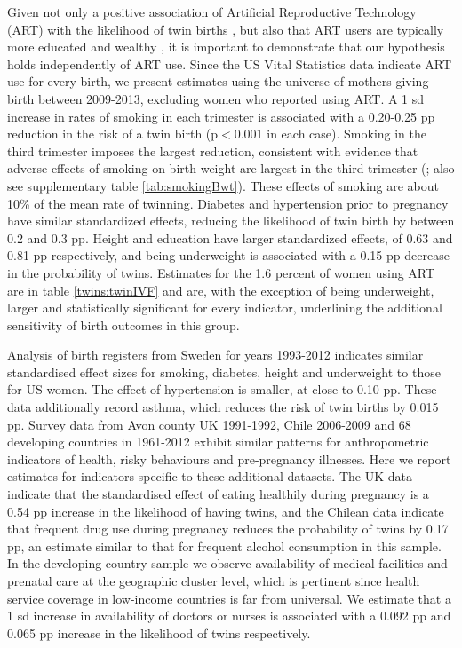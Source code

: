 \documentclass[subeqn]{article}
\begin{document}
\begin{spacing}{1.4}
Given not only a positive association of Artificial Reproductive Technology (ART)
with the likelihood of twin births \citep{Vitthalaetal2009}, but also that ART
users are typically more educated and wealthy \citep{Lundborgetal2014}, it is
important to demonstrate that our hypothesis holds independently of ART use.
Since the US Vital Statistics data indicate ART use for every birth, we present
estimates using the universe of mothers giving birth between 2009-2013, excluding
women who reported using ART. A 1 sd increase in rates of smoking in each
trimester is associated with a 0.20-0.25 pp reduction in the risk of a twin birth
(p$<$0.001 in each case). Smoking in the third trimester imposes the largest
reduction, consistent with evidence that adverse effects of smoking on birth
weight are largest in the third trimester (\citet{Bernsteinetal2005}; also see
supplementary table \ref{tab:smokingBwt}).  These effects of smoking are about
10\% of the mean rate of twinning. Diabetes and hypertension prior to pregnancy
have similar standardized effects, reducing the likelihood of twin birth by
between 0.2 and 0.3 pp. Height and education have larger standardized effects, of
0.63 and 0.81 pp respectively, and being underweight is associated with a 0.15 pp
decrease in the probability of twins. Estimates for the 1.6 percent of women using
ART are in table \ref{twins:twinIVF} and are, with the exception of being
underweight, larger and statistically significant for every indicator, underlining
the additional sensitivity of birth outcomes in this group.

Analysis of birth registers from Sweden for years 1993-2012 indicates similar
standardised effect sizes for smoking, diabetes, height and underweight to those
for US women. The effect of hypertension is smaller, at close to 0.10 pp. These
data additionally record asthma, which reduces the risk of twin births by 0.015
pp. Survey data from Avon county UK 1991-1992, Chile 2006-2009 and 68 developing
countries in 1961-2012 exhibit similar patterns for anthropometric indicators of
health, risky behaviours and pre-pregnancy illnesses. Here we report estimates
for indicators specific to these additional datasets. The UK data indicate that
the standardised effect of eating healthily during pregnancy is a 0.54 pp
increase in the likelihood of having twins, and the Chilean data indicate that
frequent drug use during pregnancy reduces the probability of twins by 0.17 pp,
an estimate similar to that for frequent alcohol consumption in this sample. In
the developing country sample we observe availability of medical facilities and
prenatal care at the geographic cluster level, which is pertinent since health
service coverage in low-income countries is far from universal. We estimate that
a 1 sd increase in  availability of doctors or nurses is associated with a 0.092
pp and 0.065 pp increase in the likelihood of twins respectively.


\end{spacing}
\end{document}
